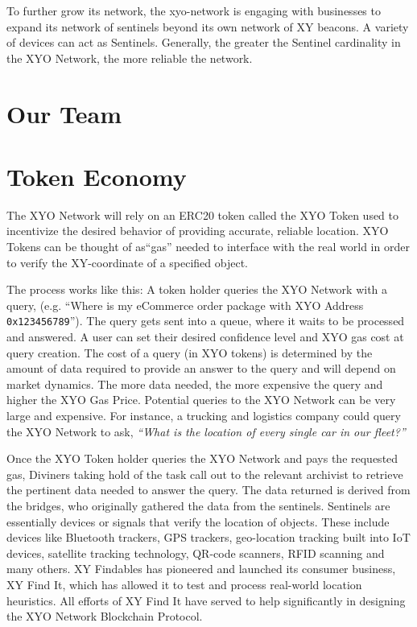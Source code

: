 \documentclass{article}
\begin{document}
To further grow its network, the \Gls{xyo-network} is engaging with businesses to expand its network of \Glspl{sentinel} beyond its own network of XY beacons. A variety of devices can act as Sentinels. Generally, the greater the Sentinel cardinality in the XYO Network, the more reliable the network.


\section{Our Team}


\section{Token Economy}

The XYO Network will rely on an ERC20 token called the XYO Token used to incentivize the desired behavior of providing accurate, reliable location. XYO Tokens can be thought of as``gas'' needed to interface with the real world in order to verify the XY-coordinate of a specified object.

The process works like this: A token holder queries the XYO Network with a query, (e.g. ``Where is my eCommerce order package with XYO Address \texttt{0x123456789}''). The query gets sent into a queue, where it waits to be processed and answered. A user can set their desired confidence level and XYO gas cost at query creation. The cost of a query (in XYO tokens) is determined by the amount of data required to provide an answer to the query and will depend on market dynamics.  The more data needed, the more expensive the query and higher the XYO Gas Price. Potential queries to the XYO Network can be very large and expensive. For instance, a trucking and logistics company could query the XYO Network to ask, \textit{``What is the location of every single car in our fleet?''}

Once the XYO Token holder queries the XYO Network and pays the requested gas, Diviners taking hold of the task call out to the relevant \Gls{archivist} to retrieve the pertinent data needed to answer the query. The data returned is derived from the \Glspl{bridge}, who originally gathered the data from the \Glspl{sentinel}. Sentinels are essentially devices or signals that verify the location of objects. These include devices like Bluetooth trackers, GPS trackers, geo-location tracking built into IoT devices, satellite tracking technology, QR-code scanners, RFID scanning and many others. XY Findables has pioneered and launched its consumer business, XY Find It, which has allowed it to test and process real-world location heuristics. All efforts of XY Find It have served to help significantly in designing the XYO Network Blockchain Protocol.
\end{document}
